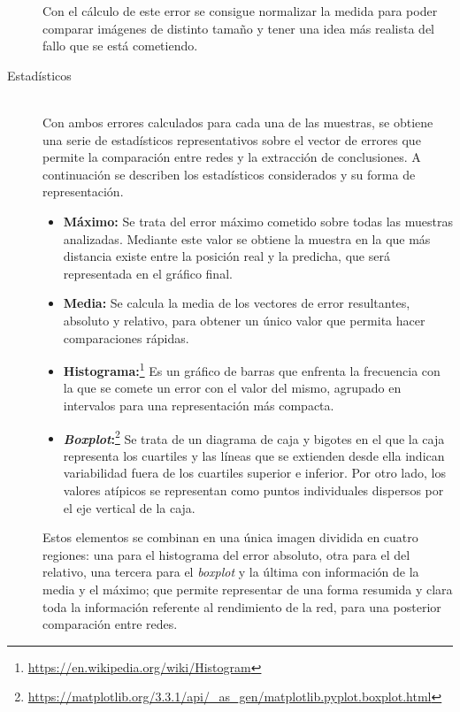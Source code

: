 \begin{description}
Con el cálculo de este error se consigue normalizar la medida para poder comparar imágenes de distinto tamaño y tener una idea más realista del fallo que se está cometiendo.

\vspace{10pt}

\item[Estadísticos] \hfill 
\vspace{10pt}
\\
Con ambos errores calculados para cada una de las muestras, se obtiene una serie de estadísticos representativos sobre el vector de errores que permite la comparación entre redes y la extracción de conclusiones. A continuación se describen los estadísticos considerados y su forma de representación.

\begin{itemize}
    \item \textbf{Máximo:} Se trata del error máximo cometido sobre todas las muestras analizadas. Mediante este valor se obtiene la muestra en la que más distancia existe entre la posición real y la predicha, que será representada en el gráfico final.
    \item \textbf{Media:} Se calcula la media de los vectores de error resultantes, absoluto y relativo, para obtener un único valor que permita hacer comparaciones rápidas.
    \item \textbf{Histograma:}\footnote{\url{https://en.wikipedia.org/wiki/Histogram}} Es un gráfico de barras que enfrenta la frecuencia con la que se comete un error con el valor del mismo, agrupado en intervalos para una representación más compacta.
    \item \textbf{\textit{Boxplot}:}\footnote{\url{https://matplotlib.org/3.3.1/api/_as_gen/matplotlib.pyplot.boxplot.html}} Se trata de un diagrama de caja y bigotes en el que la caja representa los cuartiles y las líneas que se extienden desde ella indican variabilidad fuera de los cuartiles superior e inferior. Por otro lado, los valores atípicos se representan como puntos individuales dispersos por el eje vertical de la caja.
\end{itemize}

Estos elementos se combinan en una única imagen dividida en cuatro regiones: una para el histograma del error absoluto, otra para el del relativo, una tercera para el \textit{boxplot} y la última con información de la media y el máximo; que permite representar de una forma resumida y clara toda la información referente al rendimiento de la red, para una posterior comparación entre redes.
\vspace{10pt}
\end{description}

